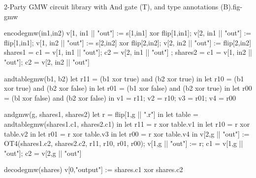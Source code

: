 \begin{fpfig}[t]{2-Party GMW circuit library with And gate (T), and type annotations (B).}{fig-gmw}
{\footnotesize
  \begin{verbatimtab}
    encodegmw(in1,in2) {
      v[1, in1 || "out"] := s[1,in1] xor flip[1,in1];
      v[2, in1 || "out"] := flip[1,in1];
      v[1, in2 || "out"] := s[2,in2] xor flip[2,in2];
      v[2, in2 || "out"] := flip[2,in2]
      { shares1 = { c1 = v[1, in1 || "out"]; c2 = v[2, in1 || "out"] };
        shares2 = { c1 = v[1, in2 || "out"]; c2 = v[2, in2 || "out"]} } 
    }
    
    andtablegmw(b1, b2) {
      let r11 = (b1 xor true) and (b2 xor true) in
      let r10 = (b1 xor true) and (b2 xor false) in
      let r01 = (b1 xor false) and (b2 xor true) in
      let r00 = (bl xor false) and (b2 xor false) in
      { v1 = r11; v2 = r10; v3 = r01; v4 = r00 }
    }
    
    andgmw(g, shares1, shares2) {
      let r = flip[1,g || ".r"] in
      let table = andtablegmw(shares1.c1, shares2.c1) in
      let r11 =  r xor table.v1 in
      let r10 =  r xor table.v2 in
      let r01 =  r xor table.v3 in
      let r00 =  r xor table.v4 in
      v[2,g || "out"] := OT4(shares1.c2, shares2.c2, r11, r10, r01, r00);
      v[1,g || "out"] := r;
      { c1 = v[1,g || "out"]; c2 = v[2,g || "out"]}
    }
    
    decodegmw(shares) { v[0,"output"] := shares.c1 xor shares.c2 }   \end{verbatimtab}
}
\end{fpfig}
